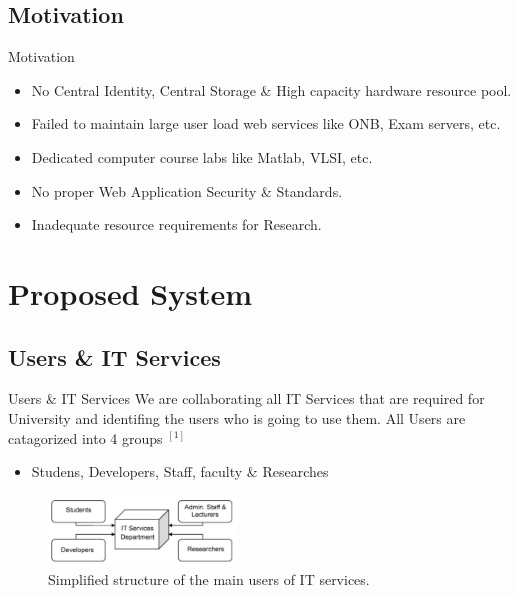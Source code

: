 \documentclass[10pt,xcolor=dvipsnames]{beamer}
\begin{document}
\subsection{Motivation}
\begin{frame}{Motivation}

\begin{itemize}
	\item No Central Identity, Central Storage \& High capacity hardware resource pool.
	\item Failed to maintain large user load web services like ONB, Exam servers, etc.
	\item Dedicated computer course labs like Matlab, VLSI, etc.
	\item No proper Web Application Security \& Standards.
	\item Inadequate resource requirements for Research.
\end{itemize}

\end{frame}



\section{Proposed System}
\subsection{Users \& IT Services}
\begin{frame}{Users \& IT Services}
We are collaborating all IT Services that are required for University and identifing the users who is going to use them. All Users are catagorized into 4 groups $ ^{[1]}$
	
	\begin{itemize}
	\item Studens, Developers, Staff, faculty \& Researches
	\end{itemize}
\begin{figure}[H]
\begin{center}
\includegraphics[width=5cm]{./it.png}
\caption{ Simplified structure of the main users of IT services. \label{fig:Simplified structure of the main users of IT services. }}
\end{center}
\end{figure}
	
\end{frame}
\end{document}

